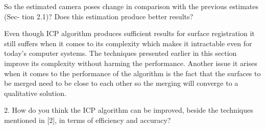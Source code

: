 So the estimated camera poses change in comparison with the previous estimates (Sec- tion 2.1)? Does this estimation produce better results?

Even though ICP algorithm produces sufficient results for surface registration it still suffers when it comes to its complexity which makes it intractable even for today's computer systems. The techniques presented earlier in this section improve its complexity without harming the performance. Another issue it arises when it comes to the performance of the algorithm is the fact that the surfaces to be merged need to be close to each other so the merging will converge to a qualitative solution.

2. How do you think the ICP algorithm can be improved, beside the techniques mentioned in [2], in terms of efficiency and accuracy?


